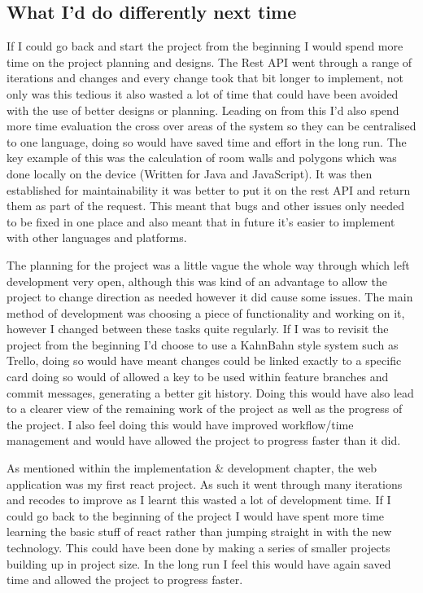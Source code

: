 \subsection{What I'd do differently next time}
If I could go back and start the project from the beginning I would spend more time on the project planning and designs. The Rest API went through a range of iterations and changes and every change took that bit longer to implement, not only was this tedious it also wasted a lot of time that could have been avoided with the use of better designs or planning. Leading on from this I'd also spend more time evaluation the cross over areas of the system so they can be centralised to one language, doing so would have saved time and effort in the long run. The key example of this was the calculation of room walls and polygons which was done locally on the device (Written for Java and JavaScript). It was then established for maintainability it was better to put it on the rest API and return them as part of the request. This meant that bugs and other issues only needed to be fixed in one place and also meant that in future it's easier to implement with other languages and platforms.

The planning for the project was a little vague the whole way through which left development very open, although this was kind of an advantage to allow the project to change direction as needed however it did cause some issues. The main method of development was choosing a piece of functionality and working on it, however I changed between these tasks quite regularly. If I was to revisit the project from the beginning I'd choose to use a KahnBahn style system such as Trello, doing so would have meant changes could be linked exactly to a specific card doing so would of allowed a key to be used within feature branches and commit messages, generating a better git history. Doing this would have also lead to a clearer view of the remaining work of the project as well as the progress of the project. I also feel doing this would have improved workflow/time management and would have allowed the project to progress faster than it did. 

As mentioned within the implementation \& development chapter, the web application was my first react project. As such it went through many iterations and recodes to improve as I learnt this wasted a lot of development time. If I could go back to the beginning of the project I would have spent more time learning the basic stuff of react rather than jumping straight in with the new technology. This could have been done by making a series of smaller projects building up in project size. In the long run I feel this would have again saved time and allowed the project to progress faster.

